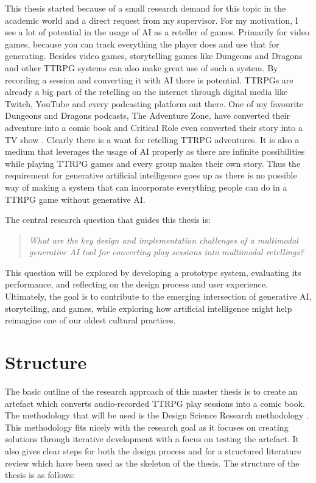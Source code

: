 This thesis started because of a small research demand for this topic in the academic world \cite{Gallotta2024LLM} and a direct request from my supervisor. For my motivation, I see a lot of potential in the usage of AI as a reteller of games. Primarily for video games, because you can track everything the player does and use that for generating. Besides video games, storytelling games like Dungeons and Dragons \cite{DnD5e} and other TTRPG systems can also make great use of such a system. By recording a session and converting it with AI there is potential. TTRPGs are already a big part of the retelling on the internet through digital media like Twitch, YouTube and every podcasting platform out there. One of my favourite Dungeons and Dragons podcasts, The Adventure Zone, have converted their adventure into a comic book \cite{AdventureZone2018} and Critical Role even converted their story into a TV show \cite{CRFOX}. Clearly there is a want for retelling TTRPG adventures. It is also a medium that leverages the usage of AI properly as there are infinite possibilities while playing TTRPG games and every group makes their own story. Thus the requirement for generative artificial intelligence goes up as there is no possible way of making a system that can incorporate everything people can do in a TTRPG game without generative AI.


The central research question that guides this thesis is:

\begin{quote}
\textit{What are the key design and implementation challenges of a multimodal generative AI tool for converting play sessions into multimodal retellings?}
\end{quote}
This question will be explored by developing a prototype system, evaluating its performance, and reflecting on the design process and user experience. Ultimately, the goal is to contribute to the emerging intersection of generative AI, storytelling, and games, while exploring how artificial intelligence might help reimagine one of our oldest cultural practices.

\section{Structure} 

The basic outline of the research approach of this master thesis is to create an artefact which converts audio-recorded TTRPG play sessions into a comic book. The methodology that will be used is the Design Science Research methodology \cite{dresch2015design}. This methodology fits nicely with the research goal as it focuses on creating solutions through iterative development with a focus on testing the artefact. It also gives clear steps for both the design process and for a structured literature review which have been used as the skeleton of the thesis. The structure of the thesis is as follows:

